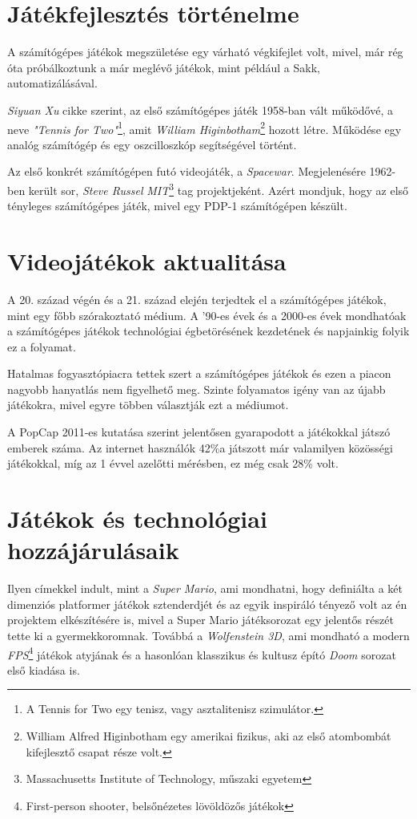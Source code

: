 \documentclass[]{thesis-ekf}
\theoremstyle{definition}
\begin{document}
	\section{Játékfejlesztés történelme}
	A számítógépes játékok megszületése egy várható végkifejlet volt, mivel, már rég óta próbálkoztunk a már meglévő játékok, mint például a Sakk, automatizálásával.
	
	\emph{Siyuan Xu} cikke szerint, az első számítógépes játék 1958-ban vált működővé, a neve \emph{"Tennis for Two"}\footnote{A Tennis for Two egy tenisz, vagy asztalitenisz szimulátor.}, amit \emph{William Higinbotham}\footnote{William Alfred Higinbotham egy amerikai fizikus, aki az első atombombát kifejlesztő csapat része volt.} hozott létre. Működése egy analóg számítógép és egy oszcilloszkóp segítségével történt.
	
	Az első konkrét számítógépen futó videojáték, a \emph{Spacewar}.
	Megjelenésére 1962-ben került sor, \emph{Steve Russel} \emph{MIT}\footnote{Massachusetts Institute of Technology, műszaki egyetem} tag projektjeként. Azért mondjuk, hogy az első tényleges számítógépes játék, mivel egy PDP-1 számítógépen készült.\cite{vidgames}
	
	\section{Videojátékok aktualitása}
	A 20. század végén és a 21. század elején terjedtek el a számítógépes játékok, mint egy főbb szórakoztató médium.
	A '90-es évek és a 2000-es évek mondhatóak a számítógépes játékok technológiai égbetörésének kezdetének és napjainkig folyik ez a folyamat.
	
	Hatalmas fogyasztópiacra tettek szert a számítógépes játékok és ezen a piacon nagyobb hanyatlás nem figyelhető meg. Szinte folyamatos igény van az újabb játékokra, mivel egyre többen választják ezt a médiumot.
	
	A PopCap 2011-es kutatása szerint jelentősen gyarapodott a játékokkal játszó emberek száma.
	Az internet használók 42\%a játszott már valamilyen közösségi játékokkal, míg az 1 évvel azelőtti mérésben, ez még csak 28\% volt.\cite{kutatas1}
	
	\section{Játékok és technológiai hozzájárulásaik}
	Ilyen címekkel indult, mint a \emph{Super Mario}, ami mondhatni, hogy definiálta a két dimenziós platformer játékok sztenderdjét és az egyik inspiráló tényező volt az én projektem elkészítésére is, mivel a Super Mario játéksorozat egy jelentős részét tette ki a gyermekkoromnak. Továbbá a \emph{Wolfenstein 3D}, ami mondható a modern \emph{FPS}\footnote{First-person shooter, belsőnézetes lövöldözős játékok} játékok atyjának és a hasonlóan klasszikus és kultusz épító \emph{Doom} sorozat első kiadása is.
	
\end{document}

